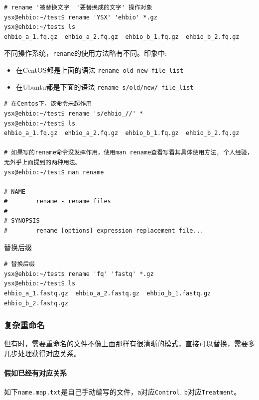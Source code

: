 \documentclass[]{article}
\numberwithin{figure}{section}
\numberwithin{table}{section}
\begin{document}
\begin{verbatim}
# rename '被替换文字' '要替换成的文字' 操作对象
ysx@ehbio:~/test$ rename 'YSX' 'ehbio' *.gz
ysx@ehbio:~/test$ ls
ehbio_a_1.fq.gz  ehbio_a_2.fq.gz  ehbio_b_1.fq.gz  ehbio_b_2.fq.gz
\end{verbatim}

不同操作系统，\texttt{rename}的使用方法略有不同。印象中:

\begin{itemize}
\item
  在CentOS都是上面的语法 \texttt{rename\ old\ new\ file\_list}
\item
  在Ubuntu都是下面的语法 \texttt{rename\ s/old/new/\ file\_list}
\end{itemize}

\begin{verbatim}
# 在Centos下，该命令未起作用
ysx@ehbio:~/test$ rename 's/ehbio_//' *
ysx@ehbio:~/test$ ls
ehbio_a_1.fq.gz  ehbio_a_2.fq.gz  ehbio_b_1.fq.gz  ehbio_b_2.fq.gz

# 如果写的rename命令没发挥作用，使用man rename查看写看其具体使用方法, 个人经验，无外乎上面提到的两种用法。
ysx@ehbio:~/test$ man rename

# NAME
#        rename - rename files
# 
# SYNOPSIS
#        rename [options] expression replacement file...
\end{verbatim}

替换后缀

\begin{verbatim}
# 替换后缀
ysx@ehbio:~/test$ rename 'fq' 'fastq' *.gz
ysx@ehbio:~/test$ ls
ehbio_a_1.fastq.gz  ehbio_a_2.fastq.gz  ehbio_b_1.fastq.gz  ehbio_b_2.fastq.gz
\end{verbatim}

\hypertarget{rename_complex}{%
\subsubsection{复杂重命名}\label{rename_complex}}

但有时，需要重命名的文件不像上面那样有很清晰的模式，直接可以替换，需要多几步处理获得对应关系。

\hypertarget{rename_for_known_relation}{%
\paragraph{假如已经有对应关系}\label{rename_for_known_relation}}

如下\texttt{name.map.txt}是自己手动编写的文件，\texttt{a}对应\texttt{Control}, \texttt{b}对应\texttt{Treatment}。
\end{document}
